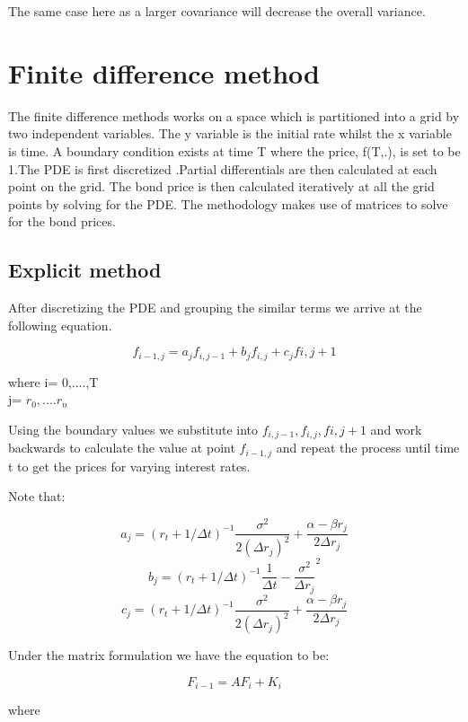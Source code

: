 \documentclass[12pt,a4paper]{article}
\begin{document}
The same case here as a larger covariance will decrease the overall variance. 


    





\section{Finite difference method}

The finite difference methods works on a space which is partitioned into a grid by two independent variables. The y variable is the initial rate whilst the x variable is time. A boundary condition exists at time T where the price, f(T,.), is set to be 1.The PDE is first discretized .Partial differentials are then calculated at each point on the grid. The bond price is then calculated iteratively at all the grid points by solving for the PDE. The methodology makes use of matrices to solve for the bond prices.  


\subsection{Explicit method}

After discretizing the PDE and grouping the similar terms we arrive at the following equation.  

$$f_{i-1,j}=a_{j}f_{i,j-1}+b_{j}f_{i,j}+c_{j}f{i,j+1}$$ 

where i= 0,....,T \\
      j= $r_0, ....r_n$
      
Using the boundary values we substitute into $f_{i,j-1}, f_{i,j}, f{i,j+1}$ and work backwards to calculate the value at point $f_{i-1,j}$ and repeat the process until time t to get the prices for varying interest rates. 

Note that:       
                                                                                                                                

$$a_{j}=(r_t+1/\Delta t)^{-1}\frac{\sigma^{2}}{2(\Delta r_j)^{2}}+\frac{\alpha-\beta r_j}{2\Delta r_j}$$
$$b_{j}=(r_t+1/\Delta t)^{-1}\frac{1}{\Delta t}-\frac{\sigma^2}{\Delta r_j}^{2}$$
$$c_{j}=(r_t+1/\Delta t)^{-1}\frac{\sigma^{2}}{2(\Delta r_j)^{2}}+\frac{\alpha-\beta r_j}{2\Delta r_j}$$

Under the matrix formulation we have the equation to be:

$$F_{i-1}=AF_{i}+K_{i}$$

where
\end{document}
